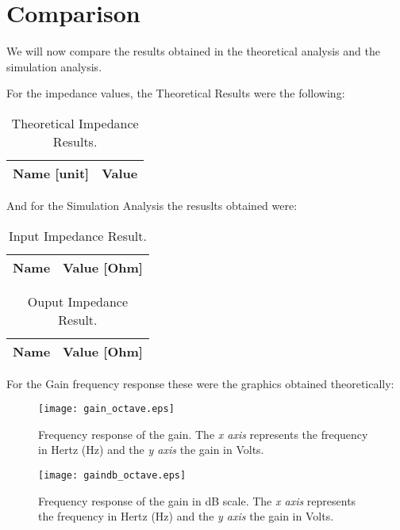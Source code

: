 \newpage
\section{Comparison}
\label{sec:comparison}
\par
We will now compare the results obtained in the theoretical analysis and the simulation analysis.\par

For the impedance values, the Theoretical Results were the following:

\begin{table}[H]
	\centering
	\begin{tabular}{|l|r|}
		\hline    
		{\bf Name [unit]} & {\bf Value} \\ \hline
		
	\end{tabular}
	\caption{Theoretical Impedance Results.}
	\label{tab:teo}
\end{table}

And for the Simulation Analysis the resuslts obtained were:

\begin{table}[H]
	\centering
	\begin{tabular}{|l|r|}
		\hline    
		{\bf Name} & {\bf Value [Ohm]} \\ \hline
		
	\end{tabular}
	\caption{Input Impedance Result.}
	\label{tab:op_sim1}
\end{table}
 
\begin{table}[H]
	\centering
	\begin{tabular}{|l|r|}
		\hline    
		{\bf Name} & {\bf Value [Ohm]} \\ \hline
		
	\end{tabular}
	\caption{Ouput Impedance Result.}
	\label{tab:op_sim1}
\end{table}

For the Gain frequency response these were the graphics obtained theoretically:

\begin{figure}[H] \centering
	\texttt{[image: gain\_octave.eps]}
	\caption{Frequency response of the gain. The \textit{x axis} represents the frequency in Hertz (Hz) and the \textit{y axis} the gain in Volts.}
	\label{fig:teo_gain}
\end{figure}

\begin{figure}[H] \centering
	\texttt{[image: gaindb\_octave.eps]}
	\caption {Frequency response of the gain in dB scale. The \textit{x axis} represents the frequency in Hertz (Hz) and the \textit{y axis} the gain in Volts.}
	\label{fig:teo_gaindB}
\end{figure}

